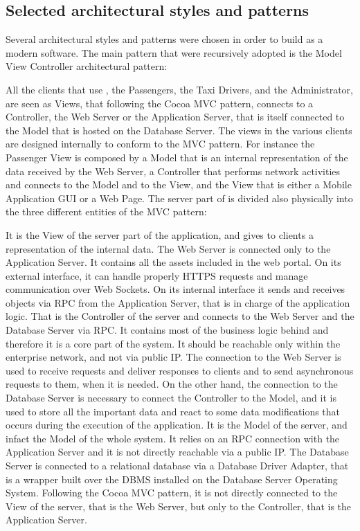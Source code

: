 \subsection{Selected architectural styles and patterns}
Several architectural styles and patterns were chosen in order to build \myTaxiService{} as a modern software.
The main pattern that were recursively adopted is the Model View Controller architectural pattern:
\begin{itemize}
	 All the clients that use \myTaxiService{}, the Passengers, the Taxi Drivers, and the Administrator, are seen as Views, that following the Cocoa MVC pattern, connects to a Controller, the Web Server or the Application Server, that is itself connected to the Model that is hosted on the Database Server.
	 The views in the various clients are designed internally to conform to the MVC pattern. For instance the Passenger View is composed by a Model that is an internal representation of the data received by the Web Server, a Controller that performs network activities and connects to the Model and to the View, and the View that is either a Mobile Application GUI or a Web Page.
	 The server part of \myTaxiService{} is divided also physically into the three different entities of the MVC pattern:
	\begin{itemize}
		 It is the View of the server part of the application, and gives to clients a representation of the internal data. The Web Server is connected only to the Application Server. It contains all the assets included in the web portal. On its external interface, it can handle properly HTTPS requests and manage communication over Web Sockets. On its internal interface it sends and receives objects via RPC from the Application Server, that is in charge of the application logic.
		 That is the Controller of the server and connects to the Web Server and the Database Server via RPC. It contains most of the business logic behind \myTaxiService{} and therefore it is a core part of the system. It should be reachable only within the enterprise network, and not via public IP. The connection to the Web Server is used to receive requests and deliver responses to clients and to send asynchronous requests to them, when it is needed. On the other hand, the connection to the Database Server is necessary to connect the Controller to the Model, and it is used to store all the important data and react to some data modifications that occurs during the execution of the application.
		 It is the Model of the server, and infact the Model of the whole \myTaxiService{} system. It relies on an RPC connection with the Application Server and it is not directly reachable via a public IP. The Database Server is connected to a relational database via a Database Driver Adapter, that is a wrapper built over the DBMS installed on the Database Server Operating System. Following the Cocoa MVC pattern, it is not directly connected to the View of the server, that is the Web Server, but only to the Controller, that is the Application Server.
	\end{itemize}
\end{itemize}
